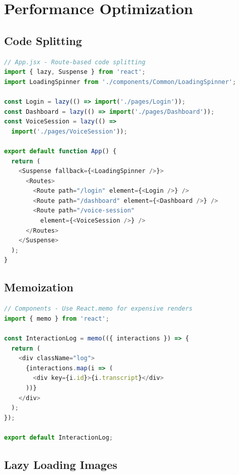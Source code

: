 \documentclass[12pt,a4paper,oneside]{article}
\begin{document}
\section{Performance Optimization}

\subsection{Code Splitting}

\begin{lstlisting}[language=javascript]
// App.jsx - Route-based code splitting
import { lazy, Suspense } from 'react';
import LoadingSpinner from './components/Common/LoadingSpinner';

const Login = lazy(() => import('./pages/Login'));
const Dashboard = lazy(() => import('./pages/Dashboard'));
const VoiceSession = lazy(() => 
  import('./pages/VoiceSession'));

export default function App() {
  return (
    <Suspense fallback={<LoadingSpinner />}>
      <Routes>
        <Route path="/login" element={<Login />} />
        <Route path="/dashboard" element={<Dashboard />} />
        <Route path="/voice-session" 
          element={<VoiceSession />} />
      </Routes>
    </Suspense>
  );
}
\end{lstlisting}

\subsection{Memoization}

\begin{lstlisting}[language=javascript]
// Components - Use React.memo for expensive renders
import { memo } from 'react';

const InteractionLog = memo(({ interactions }) => {
  return (
    <div className="log">
      {interactions.map(i => (
        <div key={i.id}>{i.transcript}</div>
      ))}
    </div>
  );
});

export default InteractionLog;
\end{lstlisting}

\subsection{Lazy Loading Images}
\end{document}

